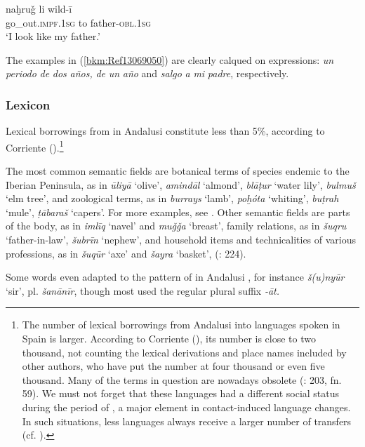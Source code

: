 \documentclass[output=paper,modfonts,nonflat]{langsci/langscibook}
\begin{document}
\ex
\gll naḫruǧ li wild-ī\\
  go\_out.\textsc{impf.1sg} to father-\textsc{obl.1sg}\\
\glt ‘I look like my father.’
\z
\z

The examples in (\ref{bkm:Ref13069050}) are clearly calqued on  expressions: \textit{un} \textit{periodo} \textit{de} \textit{dos} \textit{años,} \textit{de} \textit{un} \textit{año} and \textit{salgo} \textit{a} \textit{mi} \textit{padre}, respectively. 
 
\subsubsection{Lexicon}\largerpage[-1]

Lexical borrowings from  in Andalusi  constitute less than 5\%, according to Corriente (\citeyear[142]{Corriente1992book}).\footnote{The number of lexical borrowings from Andalusi  into  languages spoken in Spain is larger. According to Corriente (\citeyear{Corriente2005}), its number is close to two thousand, not counting the lexical derivations and place names included by other authors, who have put the number at four thousand or even five thousand. Many of the terms in question are nowadays obsolete (\citealt{Corriente2005}: 203, fn. 59). We must not forget that these languages had a different social status during the period of , a major element in contact-induced language changes. In such situations, less  languages always receive a larger number of transfers (cf.  \citealt{CorrientePereiraVicente2019}).} 

The most common semantic fields are botanical terms of species endemic to the Iberian Peninsula, as in \textit{ūliyā} ‘olive’, \textit{amindāl} ‘almond’, \textit{blāṭur} ‘water lily’, \textit{bulmuš} ‘elm tree’, and zoological terms, as in \textit{burrays} ‘lamb’, \textit{poḫóta} ‘whiting’, \textit{buṭrah} ‘mule’, \textit{ṭābaraš} ‘capers’. For more examples, see \citet{CorrientePereiraVicente2017}. Other semantic fields are parts of the body, as in \textit{imlīq}  ‘navel’ and \textit{muǧǧa} ‘breast’, family relations, as in \textit{šuqru} ‘father-in-law’, \textit{šubrīn} ‘nephew’, and household items and technicalities of various professions, as in \textit{šuqūr} ‘axe’ and \textit{šayra} ‘basket’, (\citealt{CorrientePereiraVicente2015}: 224). 

Some words even adapted to the pattern of  in Andalusi , for instance \textit{š(u)nyūr} ‘sir’, pl. \textit{šanānīr}, though most used the regular plural suffix \textit{-āt.}
\end{document}

